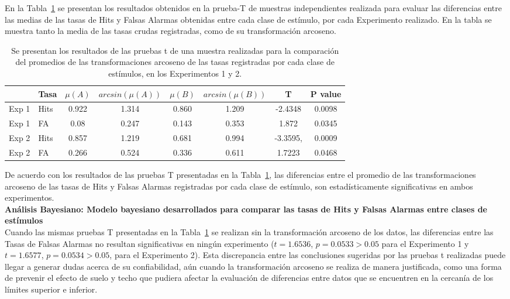 En la Tabla~\ref{Tabla_t-HitsyFA} se presentan los resultados obtenidos en la prueba-T de muestras independientes realizada para evaluar las diferencias entre las medias de las tasas de Hits y Falsas Alarmas obtenidas entre cada clase de estímulo, por cada Experimento realizado. En la tabla se muestra tanto la media de las tasas crudas registradas, como de su transformación arcoseno.\\

\begin{table}
\caption[Prueba T para evaluar diferencias entre las tasas de ejecución (Hits y F. Alarmas) promedio registradas por cada condición]{Se presentan los resultados de las pruebas t de una muestra realizadas para la comparación del promedios de las transformaciones arcoseno de las tasas registradas por cada clase de estímulos, en los Experimentos 1 y 2.}
\label{Tabla_t-HitsyFA}
\centering
\begin{tabular}{l l | c c c c c c}
\toprule
\textbf{} & \textbf{Tasa} & \textbf{$\mu(A)$} & \textbf{$arcsin(\mu(A))$} & \textbf{$\mu(B)$} & \textbf{$arcsin(\mu(B))$} &\textbf{T} & \textbf{P value}\\
\midrule
Exp 1 & Hits & 0.922 & 1.314 & 0.860 & 1.209 & -2.4348 & 0.0098 \\
Exp 1 & FA & 0.08 & 0.247 & 0.143 & 0.353 & 1.872 & 0.0345 \\
Exp 2 & Hits & 0.857 & 1.219 & 0.681 & 0.994 & -3.3595, & 0.0009 \\
Exp 2 & FA & 0.266 & 0.524 & 0.336 & 0.611 & 1.7223 & 0.0468 \\
\bottomrule
\end{tabular}
\end{table}

De acuerdo con los resultados de las pruebas T presentadas en la Tabla~\ref{Tabla_t-HitsyFA}, las diferencias entre el promedio de las transformaciones arcoseno de las tasas de Hits y Falsas Alarmas registradas por cada clase de estímulo, son estadísticamente significativas en ambos experimentos.\\

\textbf{Análisis Bayesiano: Modelo bayesiano desarrollados para comparar las tasas de Hits y Falsas Alarmas entre clases de estímulos}\\

Cuando las mismas pruebas T presentadas en la Tabla~\ref{Tabla_t-HitsyFA} se realizan sin la transformación arcoseno de los datos, las diferencias entre las Tasas de Falsas Alarmas no resultan significativas en ningún experimento ($t=1.6536$, $p=0.0533>0.05$ para el Experimento 1 y $t=1.6577$, $p=0.0534>0.05$, para el Experimento 2). Esta discrepancia entre las conclusiones sugeridas por las pruebas t realizadas puede llegar a generar dudas acerca de su confiabilidad, aún cuando la transformación arcoseno se realiza de manera justificada, como una forma de prevenir el efecto de suelo y techo que pudiera afectar la evaluación de diferencias entre datos que se encuentren en la cercanía de los límites superior e inferior.\\

